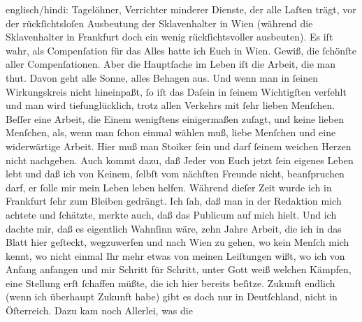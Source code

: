 \begin{ledgroupsized}[t]{13cm}
{{{                  englisch/hindi: Tagelöhner, Verrichter minderer Dienste}}}\label{K_L02868-5h}, der alle Laſten
               trägt, vor der rückſichtsloſen Ausbeutung der Sklavenhalter in Wien (während die Sklavenhalter in Frankfurt doch ein wenig  rückſichtsvoller ausbeuten). Es iſt wahr, als Compenſation für das Alles hatte
               ich Euch in Wien.  Gewiß, die ſchönſte aller Compenſationen. Aber  die Hauptſache im Leben iſt die Arbeit, die man thut. Davon geht alle
               Sonne, alles Behagen aus. Und wenn man in ſeinen Wirkungskreis nicht hineinpaßt, ſo
               iſt das Daſein in ſeinem Wichtigſten verfehlt und man wird tiefunglücklich, trotz
               allen Verkehrs {\pb}mit ſehr lieben Menſchen. Beſſer
               eine Arbeit, die Einem wenigſtens einigermaßen zuſagt, und keine lieben Menſchen,
               als, wenn man ſchon einmal wählen muß, liebe Menſchen und eine widerwärtige Arbeit.
                  \introOben{}Hier muß man Stoiker ſein und darf ſeinem weichen Herzen nicht
                  nachgeben.\introOben{} Auch kommt dazu, daß Jeder von Euch jetzt ſein eigenes Leben lebt
               und daß ich von \strikeout{\textcolor{gray}{K}} Keinem, ſelbſt vom nächſten Freunde nicht, beanſpruchen darf, er ſolle mir
               mein Leben leben helfen. Während dieſer Zeit wurde ich in Frankfurt ſehr zum Bleiben gedrängt. Ich ſah, daß  man in der Redaktion mich achtete und ſchätzte, merkte auch, daß das
               Publicum auf mich hielt. Und ich dachte mir, daß es eigentlich Wahnſinn wäre, zehn
               Jahre Arbeit, die ich in das Blatt hier geſteckt, wegzuwerfen\strikeout{,} und nach
                  Wien zu gehen, wo kein Menſch mich kennt, wo
               nicht einmal Ihr mehr etwas von meinen Leiſtungen wißt, wo ich von Anfang anfangen
                   und mir Schritt für Schritt, unter Gott weiß
               welchen Kämpfen, {\pb}eine Stellung erſt ſchaffen müßte,
               die ich hier bereits beſitze. Zukunft endlich (wenn ich überhaupt Zukunft habe) gibt
               es doch nur in Deutſchland, nicht in Öſterreich. Dazu kam noch Allerlei, was die

\end{ledgroupsized}
